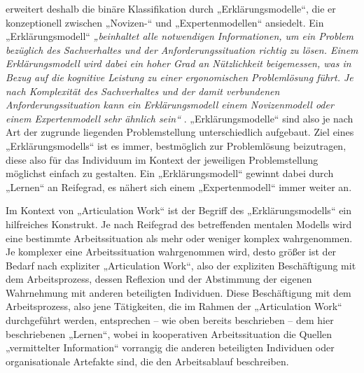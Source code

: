 \citet{Ifenthaler06} erweitert deshalb die binäre Klassifikation durch „Erklärungsmodelle“, die er konzeptionell zwischen „Novizen-“ und „Expertenmodellen“ ansiedelt. Ein „Erklärungsmodell“ \emph{„beinhaltet alle notwendigen Informationen, um ein Problem bezüglich des Sachverhaltes und der Anforderungssituation richtig zu lösen. Einem Erklärungsmodell wird dabei ein hoher Grad an Nützlichkeit beigemessen, was in Bezug auf die kognitive Leistung zu einer ergonomischen Problemlösung führt. Je nach Komplexität des Sachverhaltes und der damit verbundenen Anforderungssituation kann ein Erklärungsmodell einem Novizenmodell oder einem Expertenmodell sehr ähnlich sein“} \citep[][S. 21]{Ifenthaler06}. „Erklärungsmodelle“ sind also je nach Art der zugrunde liegenden Problemstellung unterschiedlich aufgebaut. Ziel eines „Erklärungsmodells“ ist es immer, bestmöglich zur Problemlösung beizutragen, diese also für das Individuum im Kontext der jeweiligen Problemstellung möglichst einfach zu gestalten. Ein „Erklärungsmodell“ gewinnt dabei durch „Lernen“ an Reifegrad, es nähert sich einem „Expertenmodell“ immer weiter an.

Im \wichtig Kontext von „Articulation Work“ ist der Begriff des „Erklärungsmodells“ ein hilfreiches Konstrukt. Je nach Reifegrad des betreffenden mentalen Modells wird eine bestimmte Arbeitssituation als mehr oder weniger komplex wahrgenommen. Je komplexer eine Arbeitssituation wahrgenommen wird, desto größer ist der Bedarf nach expliziter „Articulation Work“, also der expliziten Beschäftigung mit dem Arbeitsprozess, dessen Reflexion und der Abstimmung der eigenen Wahrnehmung mit anderen beteiligten Individuen. Diese Beschäftigung mit dem Arbeitsprozess, also jene Tätigkeiten, die im Rahmen der „Articulation Work“ durchgeführt werden, entsprechen -- wie oben bereits beschrieben -- dem hier beschriebenen „Lernen“, wobei in kooperativen Arbeitssituation die Quellen „vermittelter Information“ vorrangig die anderen beteiligten Individuen oder organisationale Artefakte sind, die den Arbeitsablauf beschreiben. 


